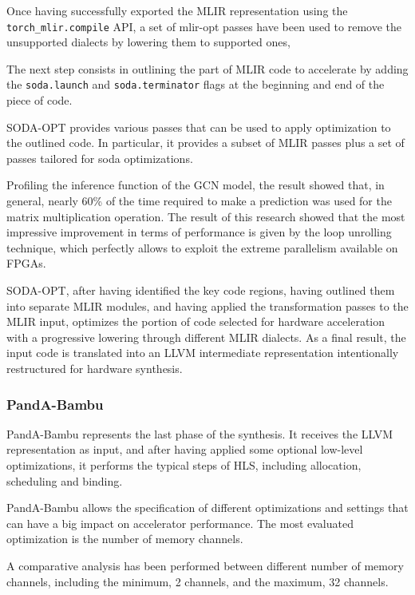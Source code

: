 \documentclass[11pt,a4paper,twocolumn]{article}
\begin{document}
Once having successfully exported the MLIR representation using the \lstinline{torch_mlir.compile} API, a set of mlir-opt passes have been used to remove the unsupported dialects by lowering them to supported ones,

The next step consists in outlining the part of MLIR code to accelerate by adding the \lstinline{soda.launch} and \lstinline{soda.terminator} flags at the beginning and end of the piece of code.

SODA-OPT provides various passes that can be used to apply optimization to the outlined code.
In particular, it provides a subset of MLIR passes plus a set of passes tailored for soda optimizations.

Profiling the inference function of the GCN model, the result showed that, in general, nearly 60\% of the time required to make a prediction was used for the matrix multiplication operation.
The result of this research showed that the most impressive improvement in terms of performance is given by the loop unrolling technique, which perfectly allows to exploit the extreme parallelism available on FPGAs.

SODA-OPT, after having identified the key code regions, having outlined them into separate MLIR modules, and having applied the transformation passes to the MLIR input, optimizes the portion of code selected for hardware acceleration with a progressive lowering through different MLIR dialects.
As a final result, the input code is translated into an LLVM intermediate representation intentionally restructured for hardware synthesis.

\subsubsection*{PandA-Bambu}

PandA-Bambu represents the last phase of the synthesis.
It receives the LLVM representation as input, and after having applied some optional low-level optimizations, it performs the typical steps of HLS, including allocation, scheduling and binding.

PandA-Bambu allows the specification of different optimizations and settings that can have a big impact on accelerator performance.
The most evaluated optimization is the number of memory channels.

A comparative analysis has been performed between different number of memory channels, including the minimum, 2 channels, and the maximum, 32 channels.
\end{document}
